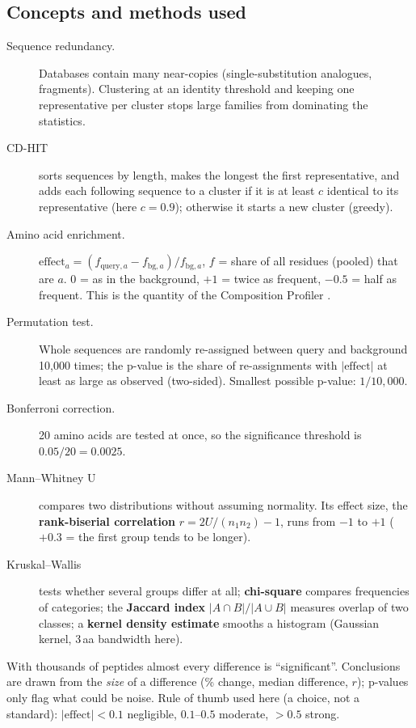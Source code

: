 \documentclass[11pt,a4paper]{article}
\newcommand{\amin}{\,aa}
\begin{document}
\subsection{Concepts and methods used}
\begin{description}
\item[Sequence redundancy.] Databases contain many near-copies (single-substitution analogues, fragments). Clustering at an identity threshold and keeping one
  representative per cluster stops large families from dominating the statistics.
\item[CD-HIT] \cite{li2006,fu2012} sorts sequences by length, makes the longest the first representative, and adds each following sequence to a cluster if it is at least
  $c$ identical to its representative (here $c=0.9$); otherwise it starts a new cluster (greedy).
\item[Amino acid enrichment.] $\text{effect}_a = (f_{\text{query},a} - f_{\text{bg},a}) / f_{\text{bg},a}$, $f$ = share of all residues (pooled) that are $a$.
  0 = as in the background, $+1$ = twice as frequent, $-0.5$ = half as frequent. This is the quantity of the Composition Profiler \cite{vacic2007}.
\item[Permutation test.] Whole sequences are randomly re-assigned between query and background 10{,}000 times; the p-value is the share of re-assignments with
  $|\text{effect}|$ at least as large as observed (two-sided). Smallest possible p-value: $1/10{,}000$.
\item[Bonferroni correction.] 20 amino acids are tested at once, so the significance threshold is $0.05/20 = 0.0025$.
\item[Mann--Whitney U] compares two distributions without assuming normality. Its effect size, the \textbf{rank-biserial correlation} $r = 2U/(n_1n_2)-1$, runs from $-1$ to $+1$
  ($+0.3$ = the first group tends to be longer).
\item[Kruskal--Wallis] tests whether several groups differ at all; \textbf{chi-square} compares frequencies of categories; the \textbf{Jaccard index}
  $|A\cap B|/|A\cup B|$ measures overlap of two classes; a \textbf{kernel density estimate} smooths a histogram (Gaussian kernel, 3\amin{} bandwidth here).
\end{description}

\begin{keypoint}
With thousands of peptides almost every difference is ``significant''. Conclusions are drawn from the \emph{size} of a difference (\% change, median difference, $r$);
p-values only flag what could be noise. Rule of thumb used here (a choice, not a standard): $|\text{effect}|<0.1$ negligible, $0.1$--$0.5$ moderate, $>0.5$ strong.
\end{keypoint}
\end{document}
